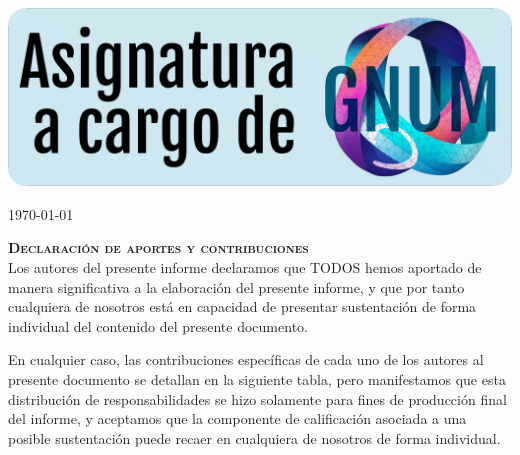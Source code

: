 \documentclass[11pt,stdletter,orderfromtodate,sigleft,twoside]{report}
\newenvironment{rightbox}[1]
 {\itemize[
    nosep,
    leftmargin=\dimexpr\textwidth-#1\relax,
    rightmargin=2pt,
    itemindent=\parindent,
    listparindent=\parindent,
  ]\item[]\relax}
 {\enditemize}
\begin{document}
\begin{titlepage}
\vfill
\begin{rightbox}{2.5cm}
    \includegraphics[width=0.95\linewidth]{./templateFigures/moduleOwnershipGNUM.png}
\end{rightbox}
\vfill

\today

\end{titlepage}
\newpage


\thispagestyle{declarationstyle}
\vspace*{12mm}
\begin{framed}
    {\Large \textbf{\textsc{Declaración de aportes y contribuciones}}}\\[8mm]

Los autores del presente informe declaramos que TODOS hemos aportado de manera
significativa a la elaboración del presente informe, y que por tanto cualquiera
de nosotros está en capacidad de presentar sustentación de forma individual del
contenido del presente documento.

En cualquier caso, las contribuciones específicas de cada uno de los autores al
presente documento se detallan en la siguiente tabla, pero manifestamos que
esta distribución de responsabilidades se hizo solamente para fines de
producción final del informe, y aceptamos que la componente de calificación
asociada a una posible sustentación puede recaer en cualquiera de nosotros de
forma individual.

\end{framed}

\vfill
\end{document}
